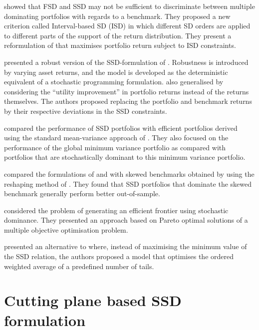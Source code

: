 \cite{liu2021} showed that FSD and SSD may not be sufficient to discriminate between
multiple dominating portfolios with regards to a benchmark. They proposed a new criterion called Interval-based SD (ISD) in which different SD orders are applied to different parts of the support of the return distribution. They present a reformulation of \cite{dentcheva2006} that maximises portfolio return subject to ISD constraints.


\cite{sehgal2019b} presented a robust version of the SSD-formulation of \cite{dentcheva2006}. Robustness is introduced by varying asset returns, and the model is developed as the deterministic equivalent of a stochastic programming formulation. \cite{goel2021} also generalised \cite{dentcheva2006} by considering the ``utility improvement'' in portfolio returns instead of the returns themselves. The authors proposed replacing the portfolio and benchmark returns by their respective deviations in the SSD constraints.

\cite{malavasi21} compared the performance of SSD portfolios with efficient portfolios derived using the standard mean-variance approach 
of \cite{mark52}. They also focused on the performance of the global minimum variance portfolio as compared with portfolios 
that are stochastically dominant to this minimum variance portfolio.

\cite{cesarone2022} compared the formulations of \cite{roman2013} and \cite{kopa2015} with skewed benchmarks obtained by using
 the reshaping method of \cite{valle2017}. They found that SSD portfolios that dominate the skewed benchmark generally
perform better out-of-sample. 

\cite{liesio23} considered the problem of generating an efficient  frontier using stochastic dominance. They presented an approach based on Pareto optimal solutions of a multiple objective optimisation problem.

\cite{cesarone2024} presented an alternative to \cite{roman2013} where,
 instead of maximising the minimum value of the SSD relation, the authors proposed a model that optimises 
the ordered weighted average of a predefined number of tails.





\section{Cutting plane based SSD formulation}
\label{sec3}

